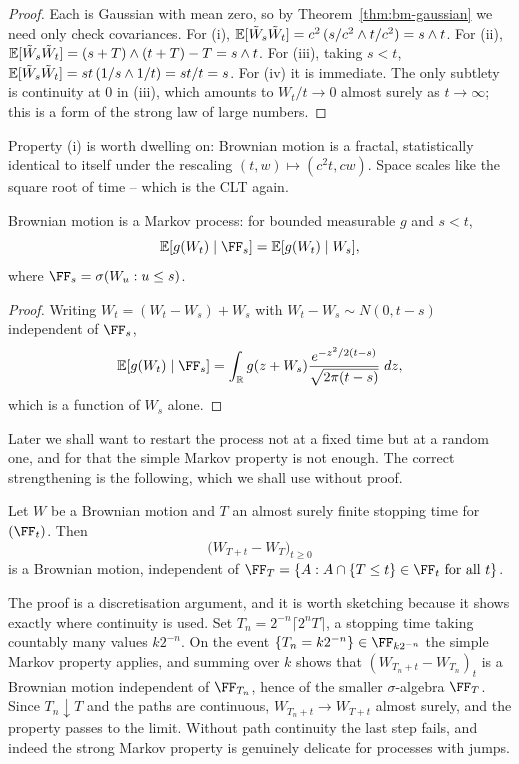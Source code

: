 \documentclass[a4paper]{scrartcl}
\begin{document}
\begin{proof}
	Each is Gaussian with mean zero, so by Theorem~\ref{thm:bm-gaussian} we need only check covariances. For (i), $\mathbb{E}[\tilde W_s\tilde W_t] = c^2\,(s/c^2 \wedge t/c^2) = s\wedge t$. For (ii), $\mathbb{E}[\tilde W_s \tilde W_t] = (s+T)\wedge(t+T) - T = s\wedge t$. For (iii), taking $s<t$, $\mathbb{E}[\tilde W_s\tilde W_t] = st\,(1/s \wedge 1/t) = st/t = s$. For (iv) it is immediate. The only subtlety is continuity at $0$ in (iii), which amounts to $W_t/t \to 0$ almost surely as $t\to\infty$; this is a form of the strong law of large numbers.
\end{proof}

Property (i) is worth dwelling on: Brownian motion is a fractal, statistically identical to itself under the rescaling $(t,w)\mapsto(c^2t, cw)$. Space scales like the square root of time -- which is the CLT again.

\begin{theorem}
	Brownian motion is a Markov process: for bounded measurable $g$ and $s<t$,
	$$
	\EE[g(W_t)\mid\FF_s] = \EE[g(W_t)\mid W_s],
	$$
	where $\FF_s = \sigma(W_u : u \leq s)$.
\end{theorem}

\begin{proof}
	Writing $W_t = (W_t - W_s) + W_s$ with $W_t-W_s\sim N(0,t-s)$ independent of $\FF_s$,
	$$
	\EE[g(W_t)\mid\FF_s] = \int_\R g(z + W_s)\frac{e^{-z^2/2(t-s)}}{\sqrt{2\pi(t-s)}}\dd z,
	$$
	which is a function of $W_s$ alone.
\end{proof}

Later we shall want to restart the process not at a fixed time but at a random one, and for that the simple Markov property is not enough. The correct strengthening is the following, which we shall use without proof.

\begin{theorem}\label{thm:strong-markov}
	Let $W$ be a Brownian motion and $T$ an almost surely finite stopping time for $(\FF_t)$. Then
	$$
	\big(W_{T+t} - W_T\big)_{t\geq0}
	$$
	is a Brownian motion, independent of $\FF_T = \{A : A \cap \{T\leq t\} \in \FF_t \text{ for all } t\}$.
\end{theorem}

\begin{remark}
	The proof is a discretisation argument, and it is worth sketching because it shows exactly where continuity is used. Set $T_n = 2^{-n}\lceil 2^nT\rceil$, a stopping time taking countably many values $k2^{-n}$. On the event $\{T_n = k2^{-n}\}\in\FF_{k2^{-n}}$ the simple Markov property applies, and summing over $k$ shows that $(W_{T_n+t}-W_{T_n})_t$ is a Brownian motion independent of $\FF_{T_n}$, hence of the smaller $\sigma$-algebra $\FF_T$. Since $T_n \downarrow T$ and the paths are continuous, $W_{T_n+t}\to W_{T+t}$ almost surely, and the property passes to the limit. Without path continuity the last step fails, and indeed the strong Markov property is genuinely delicate for processes with jumps.
\end{remark}
\end{document}
